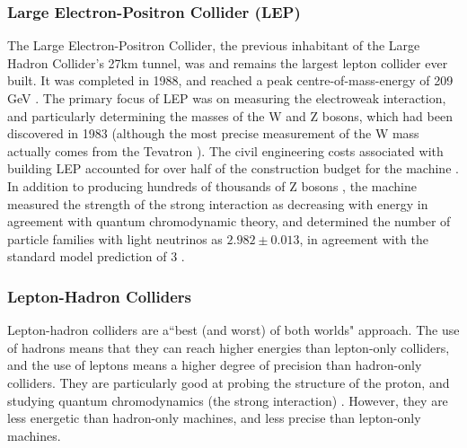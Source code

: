 \subsubsection{Large Electron-Positron Collider (LEP)}
The Large Electron-Positron Collider, the previous inhabitant of the Large Hadron Collider's 27km tunnel, was and remains the largest lepton collider ever built. It was completed in 1988, and reached a peak centre-of-mass-energy of 209 GeV \cite{CERN:LEP:Online}. The primary focus of LEP was on measuring the electroweak interaction, and particularly determining the masses of the W and Z bosons, which had been discovered in 1983 (although the most precise measurement of the W mass actually comes from the Tevatron \cite{Butterworth:Interview}). The civil engineering costs associated with building LEP accounted for over half of the construction budget for the machine \cite{LEP:History:Online}. In addition to producing hundreds of thousands of Z bosons \cite{LEP:History:Online}, the machine measured the strength of the strong interaction as decreasing with energy in agreement with quantum chromodynamic theory, and determined the number of particle families with light neutrinos as $2.982\pm 0.013$, in agreement with the standard model prediction of 3 \cite{ALEPH:Physics:Online}.

\subsubsection{Lepton-Hadron Colliders}
Lepton-hadron colliders are a``best (and worst) of both worlds" approach. The use of hadrons means that they can reach higher energies than lepton-only colliders, and the use of leptons means a higher degree of precision than hadron-only colliders. They are particularly good at probing the structure of the proton, and studying quantum chromodynamics (the strong interaction) \cite{Waters:Interview,Thorne:Interview,Butterworth:Interview}. However, they are less energetic than hadron-only machines, and less precise than lepton-only machines.

